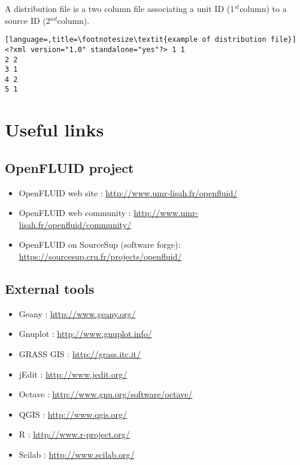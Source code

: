 A distribution file is a two column file associating a unit ID
(1$^{st}$column) to a source ID (2$^{nd}$column).
\begin{lstlisting}[language=,title=\footnotesize\textit{example of distribution file}] <?xml version="1.0" standalone="yes"?> 1 1
2 2
3 1
4 2
5 1
\end{lstlisting}


\section{Useful links}

\subsection{OpenFLUID project}

\begin{itemize}
  \item OpenFLUID web site : \textcolor{blue}{\url{http://www.umr-lisah.fr/openfluid/}}  
  \item OpenFLUID web community : \textcolor{blue}{\url{http://www.umr-lisah.fr/openfluid/community/}}
  \item OpenFLUID on SourceSup (software forge): \textcolor{blue}{\url{https://sourcesup.cru.fr/projects/openfluid/}} 
\end{itemize}


\subsection{External tools}

\begin{itemize}
  \item Geany : \textcolor{blue}{\url{http://www.geany.org/}}
  \item Gnuplot : \textcolor{blue}{\url{http://www.gnuplot.info/}}
  \item GRASS GIS : \textcolor{blue}{\url{http://grass.itc.it/}}
  \item jEdit : \textcolor{blue}{\url{http://www.jedit.org/}}
  \item Octave : \textcolor{blue}{\url{http://www.gnu.org/software/octave/}}
  \item QGIS : \textcolor{blue}{\url{http://www.qgis.org/}}
  \item R : \textcolor{blue}{\url{http://www.r-project.org/}}
  \item Scilab : \textcolor{blue}{\url{http://www.scilab.org/}} 
\end{itemize}   


